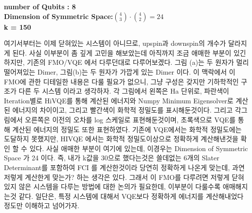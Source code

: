 \documentclass[11pt]{article}
\begin{document}
\begin{center}
\textbf{number of Qubits : 8}\\
\textbf{Dimension of Symmetric Space:\(\binom{4}{3}\cdot\binom{4}{2}=24\)}\\
\textbf{k = 150}
\end{center}
여기서부터는 이제 닫혀있는 시스템이 아니므로, upspin과 downspin의 개수가 달라지게 된다. 사실 이부분이 좀 깊게 고민을 해보았는데 아직까지 조금 애매한 부분이 있긴 하지만, 기존의 FMO/VQE 에서 다루던대로 다루어보겠다.
그림 (a)는 두 원자가 멀리 떨어져있는 Dimer, 그림(b)는 두 원자가 가깝게 있는 Dimer 이다. 이 맥락에서 이 FMO에 관한 디테일한 내용은 다룰 필요가 없으니, 그냥 구성은 갖지만 기하학적인 구조가 다른 두 시스템 이라고 생각하자. 
각 그림에서 왼쪽은 Ha 단위로, 파란색이 Iteration별로 HiVQE를 통해 계산된 에너지와 Numpy Minimum Eigensolver로 계산된 에너지의 차이이고, 그리고 빨간색이 화학적 정밀도를 표시해둔것이다. 
그리고 각그림에서 오른쪽은 이전의 오차를 log 스케일로 표현해둔것이며, 초록색으로 VQE를 통해 계산된 에너지의 정밀도 또한 표현하였다. 
기존에 VQE에서는 화학적 정밀도에는 도달하지 못했지만, HIVQE 에서는 화학적 정밀도이상으로 정확하게 계산해낸것을 확인 할 수 있다. 
사실 애매한 부분이 여기에 있는데, 이경우는 Dimension of Symmetric Space 가 24 이다. 즉, 내가 k값을 30으로 했다는것은 쓸데없는 6개의 Slater Determinant를 포함하여 FCI 를 계산한것이라 당연히 정확하게 나온게 맞는데, 
과연 저렇게 계산한게 맞는가? 하는 생각은 있다. 그래서 이 FMO를 다루려면 저렇게 닫혀있지 않은 시스템을 다루는 방법에 대한 논의가 필요한데, 이부분이 다룰수록 애매해지는것 같다. 
일단은, 특정 시스템에 대해서 VQE보다 정확하게 에너지를 계산해내었다 정도만 이해하고 넘어가자. 
\end{document}
